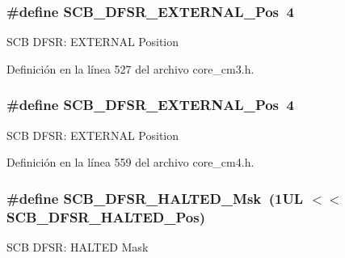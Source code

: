 \subsubsection[{\texorpdfstring{S\+C\+B\+\_\+\+D\+F\+S\+R\+\_\+\+E\+X\+T\+E\+R\+N\+A\+L\+\_\+\+Pos}{SCB_DFSR_EXTERNAL_Pos}}]{\setlength{\rightskip}{0pt plus 5cm}\#define S\+C\+B\+\_\+\+D\+F\+S\+R\+\_\+\+E\+X\+T\+E\+R\+N\+A\+L\+\_\+\+Pos~4}\hypertarget{group___c_m_s_i_s___s_c_b_ga13f502fb5ac673df9c287488c40b0c1d}{}\label{group___c_m_s_i_s___s_c_b_ga13f502fb5ac673df9c287488c40b0c1d}
S\+CB D\+F\+SR\+: E\+X\+T\+E\+R\+N\+AL Position 

Definición en la línea 527 del archivo core\+\_\+cm3.\+h.

\subsubsection[{\texorpdfstring{S\+C\+B\+\_\+\+D\+F\+S\+R\+\_\+\+E\+X\+T\+E\+R\+N\+A\+L\+\_\+\+Pos}{SCB_DFSR_EXTERNAL_Pos}}]{\setlength{\rightskip}{0pt plus 5cm}\#define S\+C\+B\+\_\+\+D\+F\+S\+R\+\_\+\+E\+X\+T\+E\+R\+N\+A\+L\+\_\+\+Pos~4}\hypertarget{group___c_m_s_i_s___s_c_b_ga13f502fb5ac673df9c287488c40b0c1d}{}\label{group___c_m_s_i_s___s_c_b_ga13f502fb5ac673df9c287488c40b0c1d}
S\+CB D\+F\+SR\+: E\+X\+T\+E\+R\+N\+AL Position 

Definición en la línea 559 del archivo core\+\_\+cm4.\+h.

\subsubsection[{\texorpdfstring{S\+C\+B\+\_\+\+D\+F\+S\+R\+\_\+\+H\+A\+L\+T\+E\+D\+\_\+\+Msk}{SCB_DFSR_HALTED_Msk}}]{\setlength{\rightskip}{0pt plus 5cm}\#define S\+C\+B\+\_\+\+D\+F\+S\+R\+\_\+\+H\+A\+L\+T\+E\+D\+\_\+\+Msk~(1\+U\+L $<$$<$ S\+C\+B\+\_\+\+D\+F\+S\+R\+\_\+\+H\+A\+L\+T\+E\+D\+\_\+\+Pos)}\hypertarget{group___c_m_s_i_s___s_c_b_ga200bcf918d57443b5e29e8ce552e4bdf}{}\label{group___c_m_s_i_s___s_c_b_ga200bcf918d57443b5e29e8ce552e4bdf}
S\+CB D\+F\+SR\+: H\+A\+L\+T\+ED Mask 

